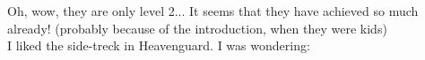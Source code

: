 Oh, wow, they are only level 2... It seems that they have achieved so much already! (probably because of the introduction, when they were kids)\\

I liked the side-treck in Heavenguard. I was wondering:\\

 
